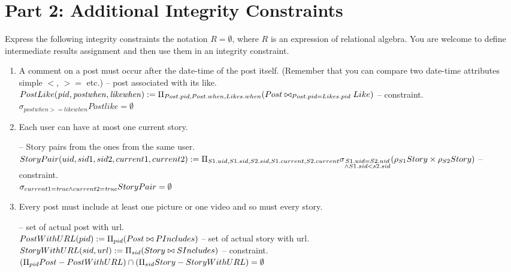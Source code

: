 \documentclass{article}
\newcommand{\var}[1]{\mathit{#1}}
\begin{document}
\section*{Part 2: Additional Integrity Constraints}


Express the following integrity constraints
 the notation $R = \emptyset$, where $R$ is an expression of relational algebra. 
You are welcome to define intermediate results  assignment
and then use them in an integrity constraint.

\begin{enumerate}

\item   %
A comment on a post must occur after the date-time of the post itself.
(Remember that you can compare two date-time attributes  simple $<$,
$>=$ etc.)
\large{
-- post associated with its like. \\[5pt]
$
PostLike(\var{pid, postwhen, likewhen}) :=
	\Pi_{Post.pid, Post.when, Likes.when} 
	(Post
	\bowtie_{\substack{Post.pid = Likes.pid}}
	Like)
	\\[10pt]
$
-- constraint. \\[5pt]
$
\sigma_{postwhen >= likewhen} Postlike = \emptyset
$
}

\item %
Each user can have at most one current story.

\large{
-- Story pairs from the ones from the same user. \\[5pt]
$
StoryPair(uid, sid1, sid2, current1, current2) :=
	\Pi_{S1.uid, S1.sid, S2.sid, S1.current, S2.current} \\
	\sigma_{\substack{S1.uid = S2.uid \\
		     	\wedge S1.sid < s2.sid}} 
			(\rho_{S1} Story \times \rho_{S2} Story)
	\\[10pt]
$
-- constraint. \\[5pt]
$
\sigma_{current1 = \var{true} \wedge current2 = \var{true}}StoryPair = \emptyset
	\\[10pt]
$
}

\item %
Every post must include at least one picture or one video and so must every story.

\large{
-- set of actual post with url. \\[5pt]
$
PostWithURL(pid) :=
	\Pi_{pid}
	(Post
	\bowtie
	PIncludes)
	\\[10pt]
$
-- set of actual story with url. \\[5pt]
$
StoryWithURL(sid, url) :=
	\Pi_{sid}
	(Story
	\bowtie
	SIncludes)
	\\[10pt]
$
-- constraint. \\[5pt]
$
(\Pi_{pid}Post - PostWithURL)
\cap
(\Pi_{sid}Story - StoryWithURL)
=
\emptyset
	\\[10pt]
$
}

\end{enumerate}
\end{document}
